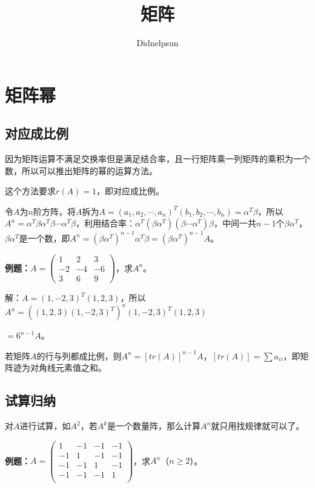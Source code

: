 \documentclass[UTF8, 12pt]{ctexart}
\author{Didnelpsun}
\title{矩阵}
\date{}
\begin{document}
\maketitle
\pagestyle{empty}
\thispagestyle{empty}
\tableofcontents
\thispagestyle{empty}
\newpage
\pagestyle{plain}
\setcounter{page}{1}
\section{矩阵幂}

\subsection{对应成比例}

因为矩阵运算不满足交换率但是满足结合率，且一行矩阵乘一列矩阵的乘积为一个数，所以可以推出矩阵的幂的运算方法。

这个方法要求$r(A)=1$，即对应成比例。

令$A$为$n$阶方阵，将$A$拆为$A=(a_1,a_2,\cdots,a_n)^T(b_1,b_2,\cdots,b_n)=\alpha^T\beta$，所以$A^n=\alpha^T\beta\alpha^T\beta\cdots\alpha^T\beta$，利用结合率：$\alpha^T(\beta\alpha^T)(\beta\cdots\alpha^T)\beta$，中间一共$n-1$个$\beta\alpha^T$，$\beta\alpha^T$是一个数，即$A^n=(\beta\alpha^T)^{n-1}\alpha^T\beta=(\beta\alpha^T)^{n-1}A$。\medskip

\textbf{例题：}$A=\left(\begin{array}{ccc}
    1 & 2 & 3 \\
    -2 & -4 & -6 \\
    3 & 6 & 9
\end{array}\right)$，求$A^n$。\medskip

解：$A=(1,-2,3)^T(1,2,3)$，所以$A^n=((1,2,3)(1,-2,3)^T)^n(1,-2,3)^T(1,2,3)$

$=6^{n-1}A$。

若矩阵$A$的行与列都成比例，则$A^n=[tr(A)]^{n-1}A$，$[tr(A)]=\sum a_{ii}$，即矩阵迹为对角线元素值之和。

\subsection{试算归纳}

对$A$进行试算，如$A^2$，若$A^k$是一个数量阵，那么计算$A^n$就只用找规律就可以了。

\textbf{例题：}$A=\left(\begin{array}{cccc}
    1 & -1 & -1 & -1 \\
    -1 & 1 & -1 & -1 \\
    -1 & -1 & 1 & -1 \\
    -1 & -1 & -1 & 1 \\
\end{array}\right)$，求$A^n$（$n\geqslant2$）。\medskip
\end{document}
